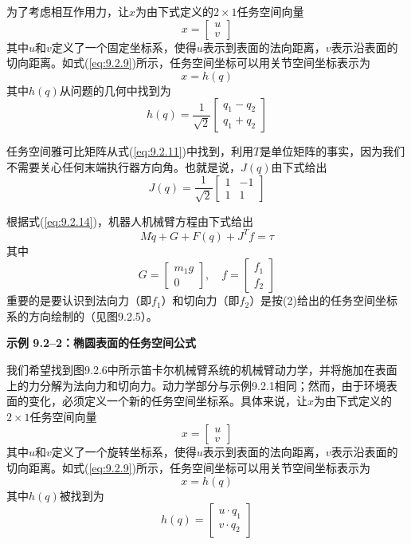 \documentclass[12pt,a4paper]{ctexart}
\begin{document}
为了考虑相互作用力，让$x$为由下式定义的$2 \times 1$任务空间向量
\begin{equation}
x = \begin{bmatrix} u \\ v \end{bmatrix}
\end{equation}
其中$u$和$v$定义了一个固定坐标系，使得$u$表示到表面的法向距离，$v$表示沿表面的切向距离。如式(\ref{eq:9.2.9})所示，任务空间坐标可以用关节空间坐标表示为
\begin{equation}
x = h(q)
\end{equation}
其中$h(q)$从问题的几何中找到为
\begin{equation}
h(q) = \frac{1}{\sqrt{2}} \begin{bmatrix} q_1 - q_2 \\ q_1 + q_2 \end{bmatrix}
\end{equation}

任务空间雅可比矩阵从式(\ref{eq:9.2.11})中找到，利用$T$是单位矩阵的事实，因为我们不需要关心任何末端执行器方向角。也就是说，$J(q)$由下式给出
\begin{equation}
J(q) = \frac{1}{\sqrt{2}} \begin{bmatrix} 1 & -1 \\ 1 & 1 \end{bmatrix}
\end{equation}

根据式(\ref{eq:9.2.14})，机器人机械臂方程由下式给出
\begin{equation}
M\ddot{q} + G + F(q) + J^T f = \tau
\end{equation}
其中
\[
G = \begin{bmatrix} m_1 g \\ 0 \end{bmatrix}, \quad f = \begin{bmatrix} f_1 \\ f_2 \end{bmatrix}
\]
重要的是要认识到法向力（即$f_1$）和切向力（即$f_2$）是按(2)给出的任务空间坐标系的方向绘制的（见图9.2.5）。

\textbf{示例 9.2--2：椭圆表面的任务空间公式}

我们希望找到图9.2.6中所示笛卡尔机械臂系统的机械臂动力学，并将施加在表面上的力分解为法向力和切向力。动力学部分与示例9.2.1相同；然而，由于环境表面的变化，必须定义一个新的任务空间坐标系。具体来说，让$x$为由下式定义的$2 \times 1$任务空间向量
\begin{equation}
x = \begin{bmatrix} u \\ v \end{bmatrix}
\end{equation}
其中$u$和$v$定义了一个旋转坐标系，使得$u$表示到表面的法向距离，$v$表示沿表面的切向距离。如式(\ref{eq:9.2.9})所示，任务空间坐标可以用关节空间坐标表示为
\begin{equation}
x = h(q)
\end{equation}
其中$h(q)$被找到为
\begin{equation}
h(q) = \begin{bmatrix} u \cdot q_1 \\ v \cdot q_2 \end{bmatrix}
\end{equation}
\end{document}

